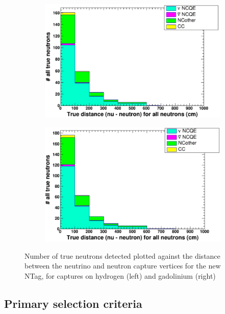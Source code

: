 \begin{figure}
    \centering
     \begin{subfigure}[b]{0.49\linewidth}
      \includegraphics[width=\linewidth]{Figures/TruCapNuNDistanceReductionNewH.PNG}
     \end{subfigure}
     \begin{subfigure}[b]{0.49\linewidth}
       \includegraphics[width=\linewidth]{Figures/TruCapNuNDistanceReductionNewGd.PNG}
      \end{subfigure} 
      \caption{Number of true neutrons detected plotted against the distance between the neutrino and neutron capture vertices for the new NTag, for captures on hydrogen (left) and gadolinium (right)}
      \label{fig:TruCapNuNDistanceReductionNewHGd} 
\end{figure}

\subsection{Primary selection criteria}

